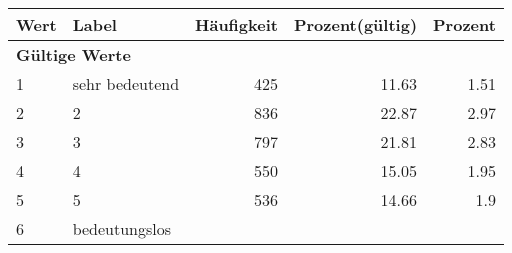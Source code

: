      \begin{longtable}{lXrrr}
     \toprule
     \textbf{Wert} & \textbf{Label} & \textbf{Häufigkeit} & \textbf{Prozent(gültig)} & \textbf{Prozent} \\
     \endhead
     \midrule
     \multicolumn{5}{l}{\textbf{Gültige Werte}}\\

     1 &
     \multicolumn{1}{X}{ sehr bedeutend   } &


       \num{425} &
       \num[round-mode=places,round-precision=2]{11,63} &
         \num[round-mode=places,round-precision=2]{1,51} \\

     2 &
     \multicolumn{1}{X}{ 2   } &


       \num{836} &
       \num[round-mode=places,round-precision=2]{22,87} &
         \num[round-mode=places,round-precision=2]{2,97} \\

     3 &
     \multicolumn{1}{X}{ 3   } &


       \num{797} &
       \num[round-mode=places,round-precision=2]{21,81} &
         \num[round-mode=places,round-precision=2]{2,83} \\

     4 &
     \multicolumn{1}{X}{ 4   } &


       \num{550} &
       \num[round-mode=places,round-precision=2]{15,05} &
         \num[round-mode=places,round-precision=2]{1,95} \\

     5 &
     \multicolumn{1}{X}{ 5   } &


       \num{536} &
       \num[round-mode=places,round-precision=2]{14,66} &
         \num[round-mode=places,round-precision=2]{1,9} \\

     6 &
     \multicolumn{1}{X}{ bedeutungslos   } &



\end{longtable}
